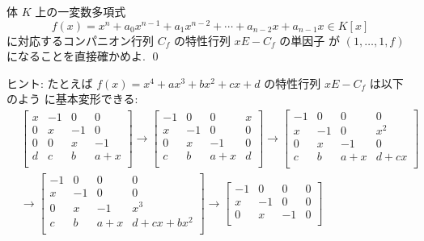 \documentclass[12pt,twoside]{jarticle}
\begin{document}

\begin{question}
\label{q:ed-j-companion}
  体 $K$ 上の一変数多項式
  \begin{equation*}
    f(x) = x^n + a_0 x^{n-1} + a_1 x^{n-2} + \cdots + a_{n-2}x + a_{n-1}x
    \in K[x]
  \end{equation*}
  に対応するコンパニオン行列 $C_f$ の特性行列 $xE - C_f$ の単因子
  が $(1,\dots,1,f)$ になることを直接確かめよ.
  \qed
\end{question}

\noindent
ヒント: たとえば $f(x)=x^4+ax^3+bx^2+cx+d $ の特性行列 $xE-C_f$ は以下のよう
に基本変形できる:
\begin{align*}
  &
  \begin{bmatrix}
    x & -1 &  0 &  0 \\
    0 &  x & -1 &  0 \\
    0 &  0 &  x & -1 \\
    d &  c &  b & a+x \\
  \end{bmatrix}
  \to
  \begin{bmatrix}
    -1 &  0 &  0  & x \\
     x & -1 &  0  & 0 \\
     0 &  x & -1  & 0 \\
     c &  b & a+x & d \\
  \end{bmatrix}
  \to
  \begin{bmatrix}
    -1 &  0 &  0  & 0 \\
     x & -1 &  0  & x^2 \\
     0 &  x & -1  & 0 \\
     c &  b & a+x & d+cx\\
  \end{bmatrix}
  \\ &
  \to
  \begin{bmatrix}
    -1 &  0 &  0  & 0 \\
     x & -1 &  0  & 0 \\
     0 &  x & -1  & x^3 \\
     c &  b & a+x & d+cx+bx^2 \\
  \end{bmatrix}
  \to
  \begin{bmatrix}
    -1 &  0 &  0  & 0 \\
     x & -1 &  0  & 0 \\
     0 &  x & -1  & 0 \\

\end{bmatrix}
\end{align*}
\end{document}
